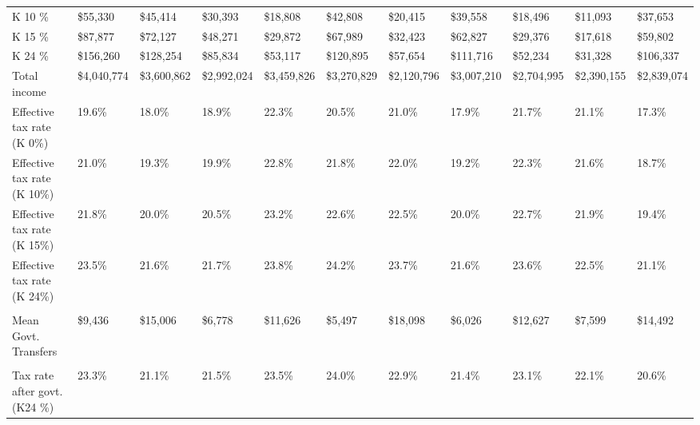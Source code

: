 \documentclass[12pt]{article}
\begin{document}
\begin{landscape}
\begin{table}[]
\begin{tabular}{lllllllllll}
K 10 \%                           & \$55,330    & \$45,414    & \$30,393     & \$18,808    & \$42,808    & \$20,415    & \$39,558    & \$18,496    & \$11,093    & \$37,653    \\
K 15 \%                           & \$87,877    & \$72,127    & \$48,271     & \$29,872    & \$67,989    & \$32,423    & \$62,827    & \$29,376    & \$17,618    & \$59,802    \\
K 24 \%                           & \$156,260   & \$128,254   & \$85,834     & \$53,117    & \$120,895   & \$57,654    & \$111,716   & \$52,234    & \$31,328    & \$106,337   \\
Total income                      & \$4,040,774 & \$3,600,862 & \$2,992,024  & \$3,459,826 & \$3,270,829 & \$2,120,796 & \$3,007,210 & \$2,704,995 & \$2,390,155 & \$2,839,074 \\
Effective tax rate (K 0\%)        & 19.6\%      & 18.0\%      & 18.9\%       & 22.3\%      & 20.5\%      & 21.0\%      & 17.9\%      & 21.7\%      & 21.1\%      & 17.3\%      \\
Effective tax rate (K 10\%)       & 21.0\%      & 19.3\%      & 19.9\%       & 22.8\%      & 21.8\%      & 22.0\%      & 19.2\%      & 22.3\%      & 21.6\%      & 18.7\%      \\
Effective tax rate (K 15\%)       & 21.8\%      & 20.0\%      & 20.5\%       & 23.2\%      & 22.6\%      & 22.5\%      & 20.0\%      & 22.7\%      & 21.9\%      & 19.4\%      \\
Effective tax rate (K 24\%)       & 23.5\%      & 21.6\%      & 21.7\%       & 23.8\%      & 24.2\%      & 23.7\%      & 21.6\%      & 23.6\%      & 22.5\%      & 21.1\%      \\
                                  &             &             &              &             &             &             &             &             &             &             \\
Mean Govt. Transfers              & \$9,436     & \$15,006    & \$6,778      & \$11,626    & \$5,497     & \$18,098    & \$6,026     & \$12,627    & \$7,599     & \$14,492    \\
                                  &             &             &              &             &             &             &             &             &             &             \\
Tax rate after govt. (K24 \%)     & 23.3\%      & 21.1\%      & 21.5\%       & 23.5\%      & 24.0\%      & 22.9\%      & 21.4\%      & 23.1\%      & 22.1\%      & 20.6\%  \\    \hline
\end{tabular}
\end{table}



\end{landscape}
\end{document}
